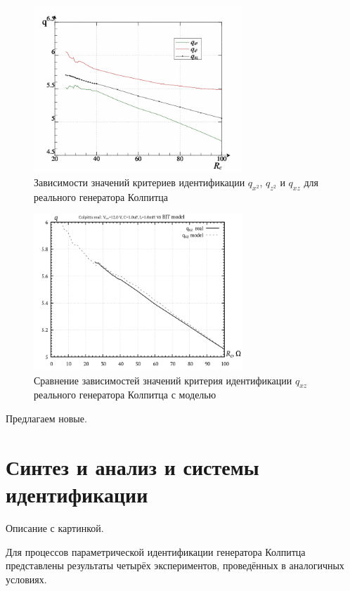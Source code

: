 \begin{figure}[htb!]
\centerline{\includegraphics[width=0.7\textwidth]{p/colp_read_q-p_Rc_q.png} }
  \caption{Зависимости значений критериев идентификации $q_{x^2}$, $q_{z^2}$ и $q_{xz}$ для реального генератора Колпитца}
\label{atu:f:colp_read_q-p_Rc_q-p_Rc_q}
\end{figure}

\begin{figure}[htb!]
\centerline{\includegraphics[width=0.7\textwidth]{p/colp_q_cml.png} }
\caption{Сравнение зависимостей значений критерия идентификации $q_{xz}$ реального генератора Колпитца с моделью}
\label{atu:f:colp_q_cml}
\end{figure}

Предлагаем новые.

\section{Синтез и анализ и системы идентификации}

Описание с картинкой.

Для процессов параметрической идентификации генератора Колпитца представлены результаты четырёх экспериментов,
проведённых в аналогичных условиях.


